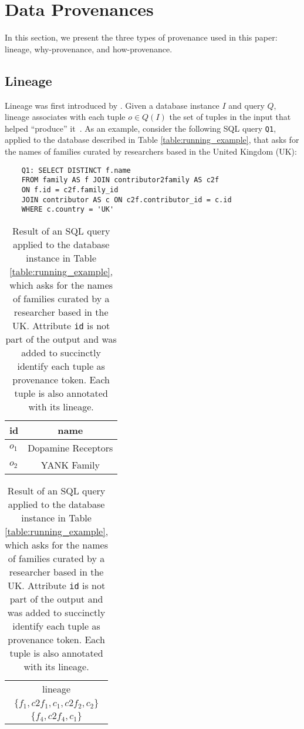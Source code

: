 \section{Data Provenances}
\label{section:preliminaries}
In this section, we present the three types of provenance used in this paper:  lineage, why-provenance, and how-provenance.

\subsection{Lineage}
Lineage was first introduced by \citet{lineageCui}. Given a database instance $I$ and query $Q$, lineage associates with each tuple $o \in Q(I)$ the set of tuples in the input
that helped ``produce'' it~\citep{CheneyProvSurvey}.
As an example, consider the following SQL query \texttt{Q1}, applied to the database described in Table \ref{table:running_example}, that asks for the names of families curated by researchers based in the United Kingdom (UK):

\begin{verbatim}
	Q1: SELECT DISTINCT f.name
	FROM family AS f JOIN contributor2family AS c2f 
	ON f.id = c2f.family_id
	JOIN contributor AS c ON c2f.contributor_id = c.id
	WHERE c.country = 'UK'
\end{verbatim}

\begin{table}[hbt]
\centering
  \begin{tabular}{|l|c|}
  \hline
    id & name\\
    \hline
    $o_1$ &  Dopamine Receptors\\
    $o_2$ & YANK Family\\
    \hline
  \end{tabular}
  \begin{tabular}{c}
  	lineage   \\
  	$\{f_1, c2f_1, c_1, c2f_2, c_2\}$ \\
  	$\{ f_4, c2f_4, c_1\}$ \\
  \end{tabular}
    \caption{Result of an SQL query applied to the database instance in Table \ref{table:running_example}, which asks for the names of families curated by a researcher based in the UK. Attribute \texttt{id} is not part of the output and was added to succinctly identify each tuple as provenance token. Each tuple is also annotated with its lineage.}
  \label{table:result}
\end{table}

